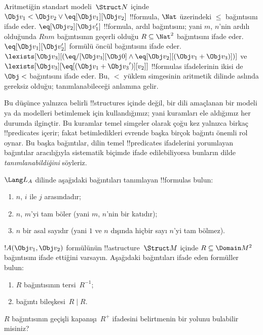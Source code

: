 \begin{ex}
Aritmetiğin standart modeli~$\Struct N$ içinde $\Obj v_1<\Obj v_2
\lor\eq[\Obj v_1][\Obj v_2]$ !!{formula}, $\Nat$ üzerindeki $\le$
bağıntısını ifade eder. $\eq[\Obj v_2][\Obj v_1']$ !!{formula}, ardıl
bağıntısını; yani $m$, $n$'nin ardılı olduğunda $Rnm$ bağıntısının
geçerli olduğu $R\subseteq\Nat^2$ bağıntısını ifade eder.
$\eq[\Obj v_1][\Obj v_2']$ formülü öncül bağıntısını ifade eder.
$\lexists[\Obj v_3][(\eq/[\Obj v_3][\Obj 0]\land
\eq[\Obj v_2][(\Obj v_1+\Obj v_3)])]$ ve
$\lexists[\Obj v_3][\eq[(\Obj v_1+{\Obj v_3}')][v_2]]$
!!{formula}s ifadelerinin ikisi de $\Obj <$ bağıntısını ifade eder.
Bu, $<$ yüklem simgesinin aritmetik dilinde aslında gereksiz olduğu;
tanımlanabileceği anlamına gelir.
\end{ex}

\begin{explain}
Bu düşünce yalnızca belirli !!{structure}s içinde değil, bir dili
amaçlanan bir modeli ya da modelleri betimlemek için kullandığımız;
yani kuramları ele aldığımız her durumda ilginçtir. Bu kuramlar temel
simgeler olarak çoğu kez yalnızca birkaç !!{predicate}s içerir; fakat
betimledikleri evrende başka birçok bağıntı önemli rol oynar. Bu başka
bağıntılar, dilin temel !!{predicate}s ifadelerini yorumlayan bağıntılar
aracılığıyla sistematik biçimde ifade edilebiliyorsa bunların dilde
\emph{tanımlanabildiğini} söyleriz.
\end{explain}

\begin{prob}
$\Lang L_A$ dilinde aşağıdaki bağıntıları tanımlayan !!{formula}s bulun:
\begin{enumerate}
\item $n$, $i$ ile $j$ arasındadır;
\item $n$, $m$'yi tam böler (yani $m$, $n$'nin bir katıdır);
\item $n$ bir asal sayıdır (yani $1$ ve $n$ dışında hiçbir sayı $n$'yi
  tam bölmez).
\end{enumerate}
\end{prob}

\begin{prob}
$!A(\Obj v_1,\Obj v_2)$ formülünün !!a{structure}~$\Struct M$ içinde
$R\subseteq\Domain M^2$ bağıntısını ifade ettiğini varsayın. Aşağıdaki
bağıntıları ifade eden formüller bulun:
\begin{enumerate}
\item $R$ bağıntısının tersi~$R^{-1}$;
\item bağıntı bileşkesi~$R\mid R$.
\end{enumerate}
$R$ bağıntısının geçişli kapanışı~$R^+$ ifadesini belirtmenin bir
yolunu bulabilir misiniz?
\end{prob}

